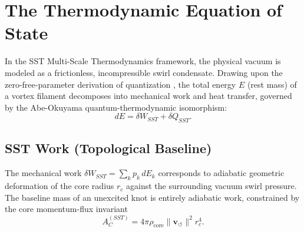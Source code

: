 \documentclass[11pt, a4paper]{article}
\newcommand{\vswirl}{\mathbf{v}_{\!\boldsymbol{\circlearrowleft}}}
\newcommand{\rhocore}{\rho_{\text{core}}}
\newcommand{\rc}{r_c}
\begin{document}
    
    



        \section{The Thermodynamic Equation of State}
            \label{sec:thermo_eos}
            
            In the SST Multi-Scale Thermodynamics framework, the physical vacuum is modeled as a frictionless, incompressible swirl condensate. Drawing upon the zero-free-parameter derivation of quantization \cite{Iskandarani_Origin}, the total energy $E$ (rest mass) of a vortex filament decomposes into mechanical work and heat transfer, governed by the Abe-Okuyama quantum-thermodynamic isomorphism:
            \begin{equation}
                dE = \delta W_{SST} + \delta Q_{SST}.
            \end{equation}
            
            \subsection{SST Work (Topological Baseline)}
                The mechanical work $\delta W_{SST} = \sum_k p_k\, dE_k$ corresponds to adiabatic geometric deformation of the core radius $\rc$ against the surrounding vacuum swirl pressure. The baseline mass of an unexcited knot is entirely adiabatic work, constrained by the core momentum-flux invariant
                \begin{equation}
                    A_C^{(SST)} = 4\pi \rhocore \lVert \vswirl\rVert^2 \rc^4.
                \end{equation}
                
\end{document}
